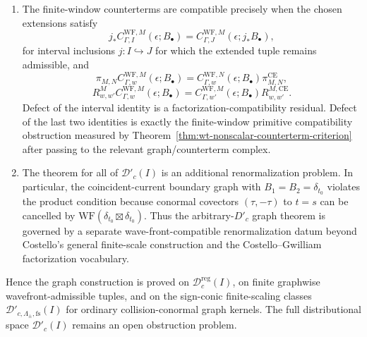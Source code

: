 \begin{prop}
\begin{enumerate}
    Set
    \[
      N_{\Gamma,\alpha,\Delta}
        =
      \max\{-1,\,
      \lfloor s_{\Gamma,\alpha,\Delta}-c_\Delta\rfloor\}.
    \]
    If \(\widetilde T\) and \(\widetilde T'\) are two local extensions
    of \(T^M_{\Gamma,\alpha}(B_\bullet)\) across \(\Delta\), then locally
    in normal coordinates to \(\Delta\)
    \[
      \widetilde T'-\widetilde T
        =
      \sum_{|\beta|\leq N_{\Gamma,\alpha,\Delta}}
      \partial_\nu^\beta\delta_\Delta\otimes
      S_{\Delta,\beta},
    \]
    with the sum empty when \(N_{\Gamma,\alpha,\Delta}=-1\).  Here
    \(S_{\Delta,\beta}\in\mathcal D'(\Delta)\) is supported in
    \(\Delta\cap\operatorname{supp}(B_\Gamma)\) and carries the same
    finite-window Hamiltonian coefficient label.  Thus the allowed
    counterterm ambiguity belongs to
    \[
      \sum_{\Delta,\alpha}
      \sum_{|\beta|\leq N_{\Gamma,\alpha,\Delta}}
      \partial_\nu^\beta\delta_\Delta\,
      \mathcal D'_{\Delta\cap\operatorname{supp}(B_\Gamma)}(\Delta)
      \widehat\otimes
      A_{\partial,\hbar_{\mathrm{QME}}}^{\mathrm{pp},w,M}(I).
    \]
    \item The finite-window counterterms are compatible precisely when
    the chosen extensions satisfy
    \[
      j_*C_{\Gamma,I}^{\mathrm{WF},M}(\epsilon;B_\bullet)
        =
      C_{\Gamma,J}^{\mathrm{WF},M}(\epsilon;j_*B_\bullet),
    \]
    for interval inclusions \(j:I\hookrightarrow J\) for which the
    extended tuple remains admissible, and
    \[
      \pi_{M,N}C_{\Gamma,w}^{\mathrm{WF},M}(\epsilon;B_\bullet)
        =
      C_{\Gamma,w}^{\mathrm{WF},N}(\epsilon;B_\bullet)
        \pi^{\mathrm{CE}}_{M,N},
    \]
    \[
      R^M_{w,w'}C_{\Gamma,w}^{\mathrm{WF},M}(\epsilon;B_\bullet)
        =
      C_{\Gamma,w'}^{\mathrm{WF},M}(\epsilon;B_\bullet)
        R^{M,\mathrm{CE}}_{w,w'} .
    \]
    Defect of the interval identity is a factorization-compatibility
    residual.  Defect of the last two identities is exactly the
    finite-window primitive compatibility obstruction measured by
    Theorem~\ref{thm:wt-nonscalar-counterterm-criterion} after passing to
    the relevant graph/counterterm complex.
    \item The theorem for all of
    \(\mathcal D'_c(I)\) is an additional renormalization problem.  In particular, the coincident-current
    boundary graph with
    \(B_1=B_2=\delta_{t_0}\) violates the product condition because
    conormal covectors \((\tau,-\tau)\) to \(t=s\) can be cancelled by
    \(\mathrm{WF}(\delta_{t_0}\boxtimes\delta_{t_0})\).  Thus the
    arbitrary-\(D'_c\) graph theorem is governed by a separate
    wave-front-compatible renormalization datum beyond Costello's
    general finite-scale construction and the Costello--Gwilliam
    factorization vocabulary.
  \end{enumerate}
  Hence the graph construction is proved on
  \(\mathcal D^{\mathrm{reg}}_c(I)\), on finite graphwise
  wavefront-admissible tuples, and on the sign-conic finite-scaling
  classes \(\mathcal D'_{c,\Lambda_\pm,\mathrm{fs}}(I)\) for ordinary
  collision-conormal graph kernels.  The full distributional space
  \(\mathcal D'_c(I)\) remains an open obstruction problem.
\end{prop}

